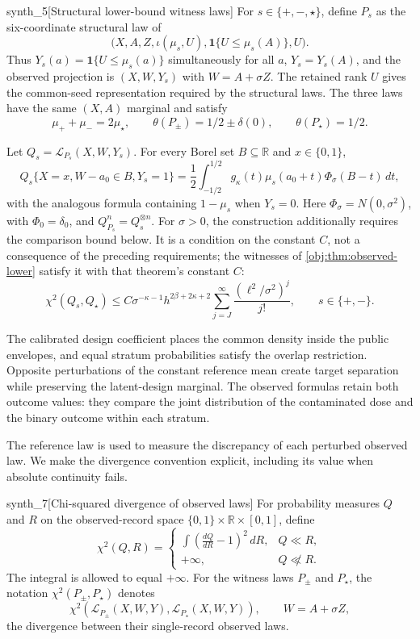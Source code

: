 \begin{definitionv}{synth_5}[Structural lower-bound witness laws]
For \(s\in\{+,-,\star\}\), define \(P_s\) as the six-coordinate structural law of
\[
\bigl(X,A,Z,\iota(\mu_s,U),\mathbf1\{U\le\mu_s(A)\},U\bigr).
\]
Thus \(Y_s(a)=\mathbf1\{U\le\mu_s(a)\}\) simultaneously for all \(a\), \(Y_s=Y_s(A)\), and the observed projection is \((X,W,Y_s)\) with \(W=A+\sigma Z\). The retained rank \(U\) gives the common-seed representation required by the structural laws. The three laws have the same \((X,A)\) marginal and satisfy
\[
\mu_++\mu_-=2\mu_\star,\qquad
\theta(P_\pm)=1/2\pm\delta(0),\qquad \theta(P_\star)=1/2.
\]

Let \(Q_s=\mathcal L_{P_s}(X,W,Y_s)\). For every Borel set \(B\subseteq\mathbb R\) and \(x\in\{0,1\}\),
\[
Q_s\{X=x,W-a_0\in B,Y_s=1\}
=\frac12\int_{-1/2}^{1/2}g_\kappa(t)\mu_s(a_0+t)\Phi_\sigma(B-t)\,dt,
\]
with the analogous formula containing \(1-\mu_s\) when \(Y_s=0\). Here \(\Phi_\sigma=N(0,\sigma^2)\), with \(\Phi_0=\delta_0\), and \(Q_{P_s}^n=Q_s^{\otimes n}\). For \(\sigma>0\), the construction additionally requires the comparison bound below. It is a condition on the constant \(C\), not a consequence of the preceding requirements; the witnesses of \cref{obj:thm:observed-lower} satisfy it with that theorem's constant \(C\):
\[
\chi^2(Q_s,Q_\star)
\le C\sigma^{-\kappa-1}h^{2\beta+2\kappa+2}
\sum_{j=J}^{\infty}\frac{(\ell^2/\sigma^2)^j}{j!},
\qquad s\in\{+,-\}.
\]
\end{definitionv}

The calibrated design coefficient places the common density inside the public envelopes, and equal stratum probabilities satisfy the overlap restriction. Opposite perturbations of the constant reference mean create target separation while preserving the latent-design marginal. The observed formulas retain both outcome values: they compare the joint distribution of the contaminated dose and the binary outcome within each stratum.

The reference law is used to measure the discrepancy of each perturbed observed law. We make the divergence convention explicit, including its value when absolute continuity fails.

\begin{definitionv}{synth_7}[Chi-squared divergence of observed laws]
For probability measures \(Q\) and \(R\) on the observed-record space \(\{0,1\}\times\mathbb R\times[0,1]\), define
\[
\chi^2(Q,R)=
\begin{cases}
\displaystyle \int\left(\frac{dQ}{dR}-1\right)^2\,dR,
& Q\ll R,\\[4pt]
+\infty,& Q\not\ll R.
\end{cases}
\]
The integral is allowed to equal \(+\infty\). For the witness laws \(P_\pm\) and \(P_\star\), the notation \(\chi^2(P_\pm,P_\star)\) denotes
\[
\chi^2\!\left(\mathcal L_{P_\pm}(X,W,Y),
              \mathcal L_{P_\star}(X,W,Y)\right),
\qquad W=A+\sigma Z,
\]
the divergence between their single-record observed laws.
\end{definitionv}

